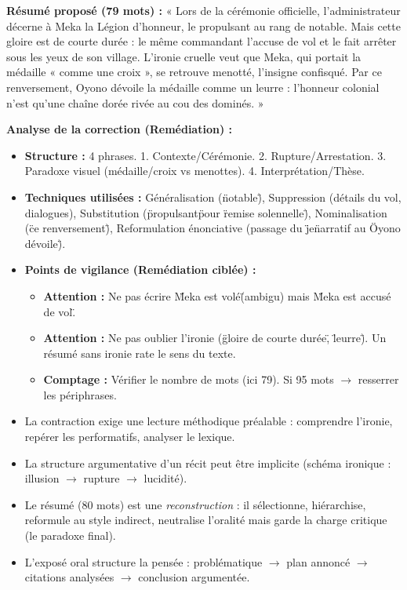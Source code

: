 \documentclass[11pt]{article}
\newcommand{\cle}[1]{{\popxbold\color{popdark}#1}}
\begin{document}
\begin{corrige}
\textbf{Résumé proposé (79 mots) :}
« Lors de la cérémonie officielle, l'administrateur décerne à Meka la Légion d'honneur, le propulsant au rang de notable. Mais cette gloire est de courte durée : le même commandant l'accuse de vol et le fait arrêter sous les yeux de son village. L'ironie cruelle veut que Meka, qui portait la médaille « comme une croix », se retrouve menotté, l'insigne confisqué. Par ce renversement, Oyono dévoile la médaille comme un leurre : l'honneur colonial n'est qu'une chaîne dorée rivée au cou des dominés. »

\textbf{Analyse de la correction (Remédiation) :}
\begin{itemize}
\item \textbf{Structure :} 4 phrases. 1. Contexte/Cérémonie. 2. Rupture/Arrestation. 3. Paradoxe visuel (médaille/croix vs menottes). 4. Interprétation/Thèse.
\item \textbf{Techniques utilisées :} Généralisation (\"notable\"), Suppression (détails du vol, dialogues), Substitution (\"propulsant\" pour \"remise solennelle\"), Nominalisation (\"ce renversement\"), Reformulation énonciative (passage du \"je\" narratif au \"Oyono dévoile\").
\item \textbf{Points de vigilance (Remédiation ciblée) :}
    \begin{itemize}
    \item \textbf{Attention :} Ne pas écrire \"Meka est volé\" (ambigu) mais \"Meka est accusé de vol\".
    \item \textbf{Attention :} Ne pas oublier l'ironie (\"gloire de courte durée\", \"leurre\"). Un résumé sans ironie rate le sens du texte.
    \item \textbf{Comptage :} Vérifier le nombre de mots (ici 79). Si 95 mots $\rightarrow$ resserrer les périphrases.
    \end{itemize}
\end{itemize}
\end{corrige}

\begin{aretenir}
\begin{itemize}
\item La \cle{contraction} exige une \cle{lecture méthodique} préalable : comprendre l'ironie, repérer les performatifs, analyser le lexique.
\item La \cle{structure argumentative} d'un récit peut être implicite (schéma ironique : illusion $\rightarrow$ rupture $\rightarrow$ lucidité).
\item Le \cle{résumé} (80 mots) est une \emph{reconstruction} : il sélectionne, hiérarchise, reformule au style indirect, neutralise l'oralité mais garde la charge critique (le paradoxe final).
\item L'\cle{exposé} oral structure la pensée : problématique $\rightarrow$ plan annoncé $\rightarrow$ citations analysées $\rightarrow$ conclusion argumentée.
\end{itemize}
\end{aretenir}
\end{document}
